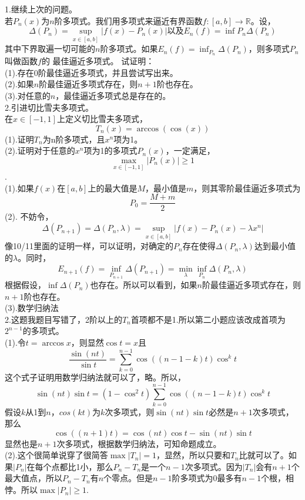 \documentclass[11pt,a4paper,openany]{article}
\begin{document}
\noindent 1.继续上次的问题。\\
若$P_n(x)$为$n$阶多项式。我们用多项式来逼近有界函数$f:[a,b]\rightarrow \mathbb{R}$。设，
\[
\Delta(P_n)=\sup_{x\in [a,b]}|f(x)-P_n(x)|
\text{以及}
E_n(f)=\inf{P_n}\Delta(P_n)
\]
其中下界取遍一切可能的$n$阶多项式。如果$\displaystyle{E_n(f)=\inf_{P_n}\Delta(P_n)}$，则多项式$P_n$叫做函数$f$的 {\kaishu 最佳逼近多项式}。
试证明：\\
(1).存在0阶最佳逼近多项式，并且尝试写出来。\\
(2).如果$n$阶最佳逼近多项式存在，则$n+1$阶也存在。\\
(3).对任意的$n$，最佳逼近多项式总是存在的。\\
2.引进切比雪夫多项式。\\
在$x\in [-1,1]$上定义切比雪夫多项式，
\[
T_n(x)=\arccos{(\cos{(x)})}
\]
(1).证明$T_n$为n阶多项式，且$x^n$项为1。\\
(2).证明对于任意的$x^n$项为1的多项式$P_n(x)$，一定满足，
\[
\max_{x\in[-1,1]}|P_n(x)|\geq 1
\]
\newpage
{}.\\
(1).如果$f(x)$在$[a,b]$上的最大值是$M$，最小值是$m$，则其零阶最佳逼近多项式为
\[
P_0=\frac{M+m}{2}
\]
(2).
不妨令，
\[
\Delta(P_{n+1})
=\Delta(P_n,\lambda)
=\sup_{x\in [a,b]}|f(x)-P_n(x)-\lambda x^n|
\]
像10/11里面的证明一样，可以证明，对确定的$P_n$存在使得$\Delta(P_n,\lambda)$达到最小值的$\lambda$。同时，
\[
E_{n+1}(f)=\inf_{P_{n+1}}\Delta(P_{n+1})
=\min_{\lambda}\inf_{P_n}\Delta(P_n,\lambda)
\]
根据假设，$\inf\Delta(P_n)$也存在。所以可以看到，如果$n$阶最佳逼近多项式存在，则$n+1$阶也存在。\\
(3).数学归纳法\\
2.这题我题目写错了，2阶以上的$T_n$首项都不是1.所以第二小题应该改成首项为$2^{n-1}$的多项式。\\
(1).令$t=\arccos x$，则显然$\cos t=x$且
\[
\frac{\sin{(nt)}}{\sin t}
=\sum_{k=0}^{n-1}\cos((n-1-k)t)\cos^k t
\]
这个式子证明用数学归纳法就可以了，略。所以，
\[
\sin{(nt)}\sin t
=(1-\cos^2 t)\sum_{k=0}^{n-1}\cos((n-1-k)t)\cos^k t
\]
假设$k$从1到$n$，$cos(kt)$为$k$次多项式，则$\sin{(nt)}\sin t$必然是$n+1$次多项式，那么
\[
\cos((n+1)t)=\cos{(nt)} \cos t-\sin{(nt)} \sin t
\]
显然也是$n+1$次多项式，根据数学归纳法，可知命题成立。\\
(2).这个很简单说穿了很简答$\max |T_n|=1$，显然，所以只要和$T_n$比就可以了。如果$|P_n|$在每个点都比1小，那么$P_n-T_n$是一个$n-1$次多项式。因为$|T_n|$会有$n+1$个最大值点，所以$P_n-T_n$有$n$个零点。但是$n-1$阶多项式为0最多有$n-1$个根，相悖。所以$\max |P_n|\geq 1$.
\end{document}
